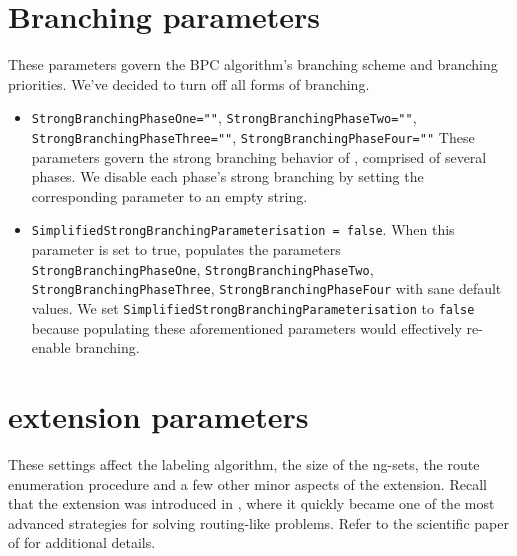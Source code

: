 \section{Branching parameters}
These parameters govern the BPC algorithm's branching scheme and branching priorities.
We've decided to turn off all forms of branching.

\begin{itemize}
	\item \texttt{StrongBranchingPhaseOne=""}, \texttt{StrongBranchingPhaseTwo=""}, \texttt{StrongBranchingPhaseThree=""}, \texttt{StrongBranchingPhaseFour=""}
	      These parameters govern the strong branching behavior of \bapcod{},
	      comprised of several phases.
	      We disable each phase's strong branching
	      by setting the corresponding parameter to an empty string.
	\item \texttt{SimplifiedStrongBranchingParameterisation = false}.
	      When this parameter is set to true, \bapcod{} populates the parameters
	      \texttt{StrongBranchingPhaseOne}, \texttt{StrongBranchingPhaseTwo}, \texttt{StrongBranchingPhaseThree}, \texttt{StrongBranchingPhaseFour}
	      with sane default values.
	      We set \texttt{SimplifiedStrongBranchingParameterisation} to \texttt{false}
	      because populating these aforementioned parameters would effectively re-enable branching.
\end{itemize}

\section{\vrpsolver{} extension parameters}

These settings affect the labeling algorithm, the size of the ng-sets, the route enumeration procedure
and a few other minor aspects of the \vrpsolver{} extension.
Recall that the \vrpsolver{} extension was introduced in \textcite{pessoa2020generic},
where it quickly became one of the most advanced strategies for solving routing-like problems.
Refer to the scientific paper of \textcite{pessoa2020generic} for additional details.

